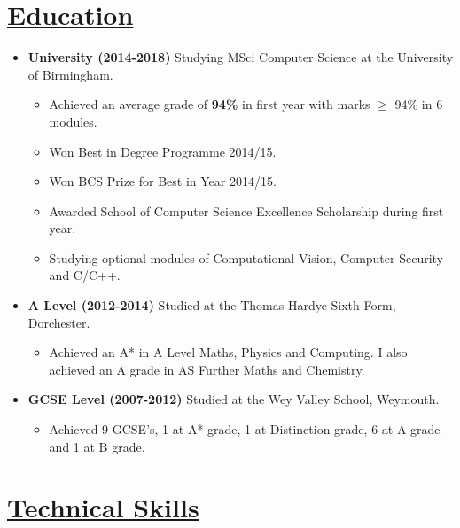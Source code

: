\documentclass[11pt]{article}
\begin{document}
	\vspace{-30pt}
	\hspace{-100pt}\section*{\underline{Education}}
		\begin {itemize}
			\item \textbf{University (2014-2018)} Studying MSci Computer Science at the University of Birmingham.
				\begin{itemize}
					\item Achieved an average grade of\textbf{ 94\%} in first year with marks $\geq$ 94\% in 6 modules.
					\item Won Best in Degree Programme 2014/15.
					\item Won BCS Prize for Best in Year 2014/15.
					\item Awarded School of Computer Science Excellence Scholarship during first year.
					\item Studying optional modules of Computational Vision, Computer Security and C/C++.
				\end{itemize}
			\item \textbf{A Level (2012-2014)} Studied at the Thomas Hardye Sixth Form, Dorchester.
				\begin{itemize}
					\item Achieved an A* in A Level Maths, Physics and Computing. I also achieved an A grade in AS Further Maths and Chemistry.
				\end{itemize}
			
			\item \textbf{GCSE Level (2007-2012)}  Studied at the Wey Valley School, Weymouth.
				\begin{itemize}
					\item Achieved 9 GCSE's, 1 at A* grade, 1 at Distinction grade, 6 at A grade and 1 at B grade.
				\end{itemize} 
		\end{itemize}
	\vspace{-20pt}
	\hspace{-100pt}\section*{\underline{Technical Skills}}
\end{document}
